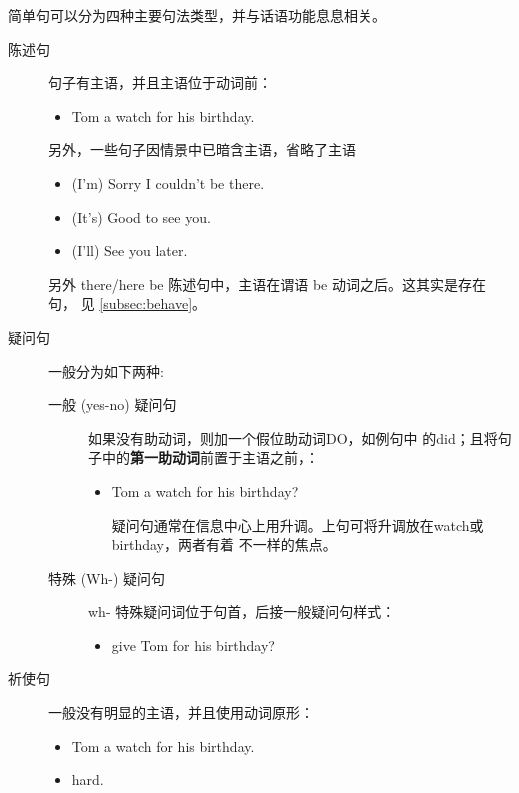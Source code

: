简单句可以分为四种主要句法类型，并与话语功能息息相关。
\begin{description}
\item[陈述句] 句子有主语，并且主语位于动词前：
  \begin{itemize}
  \item {}  Tom a watch for his birthday.
  \end{itemize}

  另外，一些句子因情景中已暗含主语，省略了主语
  \begin{itemize}
  \item (I'm) Sorry I couldn't be there.

  \item (It's) Good to see you.
  \item (I'll) See you later.
  \end{itemize}

  另外 there/here be 陈述句中，主语在谓语 be 动词之后。这其实是存在句，
  见 \cref{subsec:behave}。

\item [疑问句] 一般分为如下两种:
  \begin{description}
  \item [一般 (yes-no) 疑问句] 如果没有助动词，则加一个假位助动词DO，如例句中
    的did；且将句子中的\textbf{第一助动词}前置于主语之前，：
    \begin{itemize}
    \item {}   Tom a watch for his birthday?

      疑问句通常在信息中心上用升调。上句可将升调放在watch或birthday，两者有着
      不一样的焦点。
    \end{itemize}

  \item [特殊 (Wh-) 疑问句] wh- 特殊疑问词位于句首，后接一般疑问句样式：
    \begin{itemize}
    \item {}   give Tom for his birthday?
    \end{itemize}
  \end{description}

\item[祈使句] 一般没有明显的主语，并且使用动词原形：
  \begin{itemize}
  \item {} Tom a watch for his birthday.

  \item {}  hard.


\end{itemize}
\end{description}

